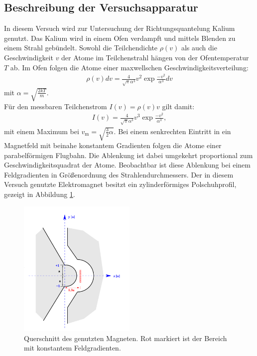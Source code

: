 \subsection{Beschreibung der Versuchsapparatur}
In diesem Versuch wird zur Untersuchung der Richtungsquantelung Kalium genutzt.
Das Kalium wird in einem Ofen verdampft und mittels Blenden zu einem Strahl gebündelt.
Sowohl die Teilchendichte $\rho(v)$ als auch die Geschwindigkeit $v$ der Atome im Teilchenstrahl
hängen von der Ofentemperatur $T$ ab. Im Ofen folgen die Atome einer
maxwellschen Geschwindigkeitsverteilung:
\begin{align}
  \rho(v)dv=\frac{4}{\sqrt{\pi}\alpha^3}v^2 \exp{\frac{-v^2}{\alpha^3}}dv
\end{align}
mit $\alpha=\sqrt{\frac{2kT}{m}}$.\\
Für den messbaren Teilchenstrom $I(v)=\rho(v)v$ gilt damit:
\begin{align}
 I(v)=\frac{4}{\sqrt{\pi}\alpha^3}v^3 \exp{\frac{-v^2}{\alpha^3}}\label{eqn:teilchenstrom},
\end{align}
mit einem Maximum bei $v_\mathrm{m}=\sqrt{\frac{3}{2}\alpha}$.
Bei einem senkrechten Eintritt in ein Magnetfeld mit beinahe konstantem Gradienten folgen
die Atome einer parabelförmigen Flugbahn. Die Ablenkung ist dabei umgekehrt proportional
zum Geschwindigkeitsquadrat der Atome.
Beobachtbar ist diese Ablenkung bei einem Feldgradienten
in Größenordnung des Strahlendurchmessers.
Der in diesem Versuch genutzte Elektromagnet besitzt ein zylinderförmiges
Polschuhprofil, gezeigt in Abbildung \ref{fig:magnet}.
\begin{figure}
   \centering
    \includegraphics[width=0.5\textwidth]{magnet.PNG}
    \caption{Querschnitt des genutzten Magneten. Rot markiert ist der Bereich mit konstantem Feldgradienten.\cite{skript}}
    \label{fig:magnet}
    \FloatBarrier
\end{figure}

